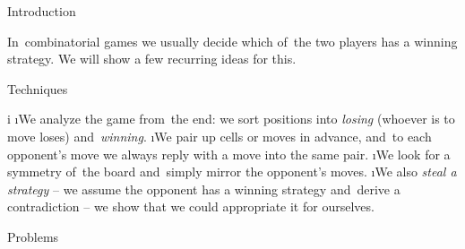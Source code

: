 





\sec Introduction

In~combinatorial games we usually decide which of~the two players has a winning strategy. We will show a few recurring ideas for this.

\sec Techniques

\begitems \style i
\i We analyze the game from~the end: we sort positions into \textit{losing} (whoever is to move loses) and~\textit{winning}.
\i We pair up cells or moves in advance, and~to each opponent's move we always reply with a move into the same pair.
\i We look for a symmetry of~the board and~simply mirror the opponent's moves.
\i We also \textit{steal a strategy} -- we assume the opponent has a winning strategy and~derive a contradiction -- we show that we could appropriate it for ourselves.
\enditems

\sec Problems

